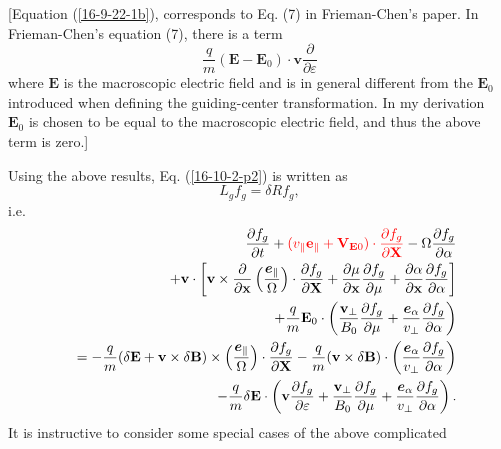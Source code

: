 \documentclass{article}
\newcommand{\tmcolor}[2]{{\color{#1}{#2}}}
\newcommand{\tmmathbf}[1]{\ensuremath{\boldsymbol{#1}}}
\begin{document}
[Equation (\ref{16-9-22-1b}), corresponds to Eq. (7) in Frieman-Chen's
paper{\cite{frieman1982}}. In Frieman-Chen's equation (7), there is a term
\[ \frac{q}{m} (\mathbf{E}-\mathbf{E}_0) \cdot \mathbf{v}
   \frac{\partial}{\partial \varepsilon} \]
where $\mathbf{E}$ is the macroscopic electric field and is in general
different from the $\mathbf{E}_0$ introduced when defining the guiding-center
transformation. In my derivation \ $\mathbf{E}_0$ is chosen to be equal to the
macroscopic electric field, and thus the above term is zero.]

Using the above results, Eq. (\ref{16-10-2-p2}) is written as
\begin{equation}
  \label{16-9-22-p1} L_g f_g = \delta R f_g,
\end{equation}
i.e.
\begin{eqnarray}
  &  & \frac{\partial f_g}{\partial t} + \tmcolor{red}{(v_{\parallel}
  \mathbf{e}_{\parallel} +\mathbf{V}_{\mathbf{E}0}) \cdot \frac{\partial
  f_g}{\partial \mathbf{X}}} - \Omega \frac{\partial f_g}{\partial \alpha}
  \nonumber\\
  &  & +\mathbf{v} \cdot \left[ \mathbf{v} \times \frac{\partial}{\partial
  \mathbf{x}} \left( \frac{\tmmathbf{e}_{\parallel}}{\Omega} \right) \cdot
  \frac{\partial f_g}{\partial \mathbf{X}} + \frac{\partial \mu}{\partial
  \mathbf{x}}  \frac{\partial f_g}{\partial \mu} + \frac{\partial
  \alpha}{\partial \mathbf{x}}  \frac{\partial f_g}{\partial \alpha} \right]
  \nonumber\\
  &  & + \frac{q}{m} \mathbf{E}_0 \cdot \left( \frac{\mathbf{v}_{\perp}}{B_0}
  \frac{\partial f_g}{\partial \mu} + \frac{\tmmathbf{e}_{\alpha}}{v_{\perp}}
  \frac{\partial f_g}{\partial \alpha} \right) \nonumber\\
  &  & = - \frac{q}{m} (\delta \mathbf{E}+\mathbf{v} \times \delta
  \mathbf{B}) \times \left( \frac{\tmmathbf{e}_{\parallel}}{\Omega}  \right)
  \cdot \frac{\partial f_g}{\partial \mathbf{X}} - \frac{q}{m} (\mathbf{v}
  \times \delta \mathbf{B}) \cdot \left(
  \frac{\tmmathbf{e}_{\alpha}}{v_{\perp}}  \frac{\partial f_g}{\partial
  \alpha} \right) \nonumber\\
  &  & - \frac{q}{m} \delta \mathbf{E} \cdot \left( \mathbf{v} \frac{\partial
  f_g}{\partial \varepsilon} + \frac{\mathbf{v}_{\perp}}{B_0}  \frac{\partial
  f_g}{\partial \mu} + \frac{\tmmathbf{e}_{\alpha}}{v_{\perp}}  \frac{\partial
  f_g}{\partial \alpha} \right) .  \label{18-12-16-1}
\end{eqnarray}
It is instructive to consider some special cases of the above complicated
\end{document}
